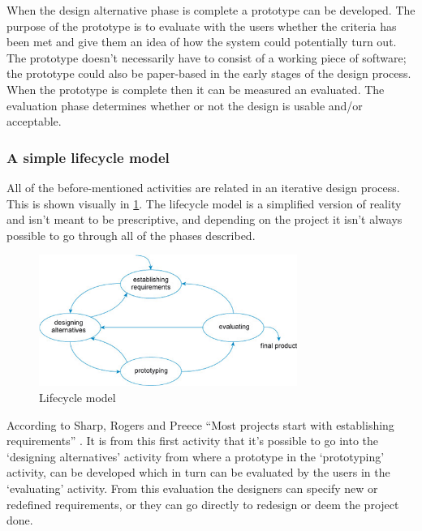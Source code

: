 When the design alternative phase is complete a prototype can be developed. The purpose of the prototype is to evaluate with the users whether the criteria has been met and give them an idea of how the system could potentially turn out. The prototype doesn’t necessarily have to consist of a working piece of software; the prototype could also be paper-based in the early stages of the design process. When the prototype is complete then it can be measured an evaluated. The evaluation phase determines whether or not the design is usable and/or acceptable. 

\subsubsection{A simple lifecycle model}
All of the before-mentioned activities are related in an iterative design process. This is shown visually in \cref{fig:LifecycleModel}. The lifecycle model is a simplified version of reality and isn’t meant to be prescriptive, and depending on the project it isn’t always possible to go through all of the phases described. 

\begin{figure}[h]
	\centering
	\includegraphics[width=0.75\textwidth]{billeder/lifecycle.png}
	\caption{Lifecycle model \citep[p.~332]{InteractionDesign}}\label{fig:LifecycleModel}
\end{figure}

According to Sharp, Rogers and Preece “Most projects start with establishing requirements” \citep[p.~333]{InteractionDesign}. It is from this first activity that it’s possible to go into the ‘designing alternatives’ activity from where a prototype in the ‘prototyping’ activity, can be developed which in turn can be evaluated by the users in the ‘evaluating’ activity. From this evaluation the designers can specify new or redefined requirements, or they can go directly to redesign or deem the project done.


